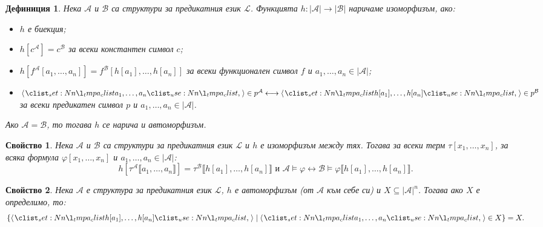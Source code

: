 \documentclass[12pt]{article}
\newcommand{\calA}{\mathcal{A}}
\newcommand{\calL}{\mathcal{L}}
\newcommand{\calB}{\mathcal{B}}
\newcommand{\db}[1]{\llbracket #1 \rrbracket}
\newtheorem*{definition}{Дефиниция}
\newtheorem*{property}{Свойство}
\theoremstyle{definition}
\begin{document}
\begin{definition}
    Нека $\calA$ и $\calB$ са структури за предикатния език $\calL$.
    Функцията $h : |\calA| \rightarrow |\calB|$ наричаме изоморфизъм, ако:
    \begin{itemize}
        \item $h$ е биекция;
        \item $h[c^\calA] = c^\calB$ за всеки константен символ $c$;
        \item $h[f^\calA[a_1, \dots, a_n]] = f^\calB[h[a_1], \dots, h[a_n]]$ за всеки функционален символ $f$ и $a_1, \dots, a_n \in |\calA|$;
        \item $\opair{a_1, \dots, a_n} \in p^\calA \longleftrightarrow \opair{h[a_1], \dots, h[a_n]} \in p^\calB$ за всеки предикатен символ $p$ и $a_1, \dots, a_n \in |\calA|$.
    \end{itemize}
    Ако $\calA = \calB$, то тогава $h$ се нарича и автоморфизъм.
\end{definition}

\begin{property}
    Нека $\calA$ и $\calB$ са структури за предикатния език $\calL$ и $h$ е изоморфизъм между тях.
    Тогава за всеки терм $\tau[x_1, \dots, x_n]$, за всяка формула $\varphi[x_1, \dots, x_n]$ и $a_1, \dots, a_n \in |\calA|$:
    \[
        h[\tau^\calA\db{a_1, \dots, a_n}] = \tau^\calB\db{h[a_1], \dots, h[a_n]} \text{ и } \calA \models \varphi \longleftrightarrow \calB \models \varphi \db{h[a_1], \dots, h[a_n]}.
    \]
\end{property}

\begin{property}
    Нека $\calA$ е структура за предикатния език $\calL$, $h$ е автоморфизъм (от $\calA$ към себе си) и $X \subseteq |\calA|^n$.
    Тогава ако $X$ е определимо, то:
    \[
        \{ \opair{h[a_1], \dots, h[a_n]} \mid \opair{a_1, \dots, a_n} \in X \} = X.
    \]
\end{property}
\end{document}
